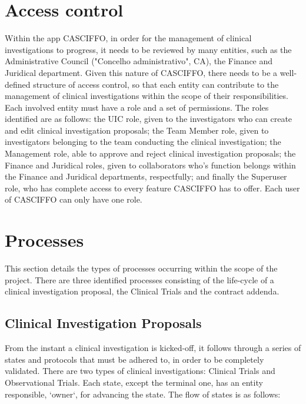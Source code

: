 \section{Access control}
\label{sec:access-control}
Within the app CASCIFFO, in order for the management of clinical investigations to progress, it needs to be reviewed by many entities, such as the Administrative Council ("Concelho administrativo", CA), the Finance and Juridical department.
Given this nature of CASCIFFO, there needs to be a well-defined structure of access control, so that each entity can contribute to the management of clinical investigations within the scope of their responsibilities. Each involved entity must have a role and a set of permissions.  
The roles identified are as follows: the UIC role, given to the investigators who can create and edit clinical investigation proposals; the Team Member role, given to investigators belonging to the team conducting the clinical investigation; the Management role, able to approve and reject clinical investigation proposals; the Finance and Juridical roles, given to collaborators who's function belongs within the Finance and Juridical departments, respectfully; and finally the Superuser role, who has complete access to every feature CASCIFFO has to offer. Each user of CASCIFFO can only have one role.

\section{Processes} 
\label{sec:processes}
This section details the types of processes occurring within the scope of the project.  
There are three identified processes consisting of the life-cycle of a clinical investigation proposal, the Clinical Trials and the contract addenda. 



\subsection{Clinical Investigation Proposals}
\label{subsec:clinical-investigation-proposals}
From the instant a clinical investigation is kicked-off, it follows through a series of states and protocols that must be adhered to, in order to be completely validated.
There are two types of clinical investigations: Clinical Trials and Observational Trials.  
Each state, except the terminal one, has an entity responsible, `owner`, for advancing the state. 
The flow of states is as follows:  

